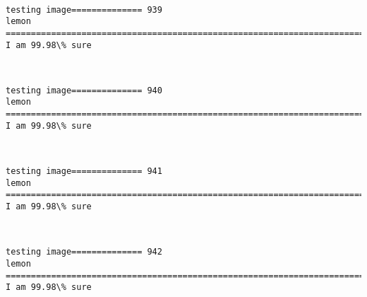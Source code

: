 \documentclass[11pt]{article}
\begin{document}
    \begin{center}
    \end{center}
    { \hspace*{\fill} \\}
    
    \begin{Verbatim}[commandchars=\\\{\}]
testing image============== 939
lemon
============================================================================
I am 99.98\% sure

    \end{Verbatim}

    \begin{center}
    \end{center}
    { \hspace*{\fill} \\}
    
    \begin{Verbatim}[commandchars=\\\{\}]
testing image============== 940
lemon
============================================================================
I am 99.98\% sure

    \end{Verbatim}

    \begin{center}
    \end{center}
    { \hspace*{\fill} \\}
    
    \begin{Verbatim}[commandchars=\\\{\}]
testing image============== 941
lemon
============================================================================
I am 99.98\% sure

    \end{Verbatim}

    \begin{center}
    \end{center}
    { \hspace*{\fill} \\}
    
    \begin{Verbatim}[commandchars=\\\{\}]
testing image============== 942
lemon
============================================================================
I am 99.98\% sure

    \end{Verbatim}
\end{document}

